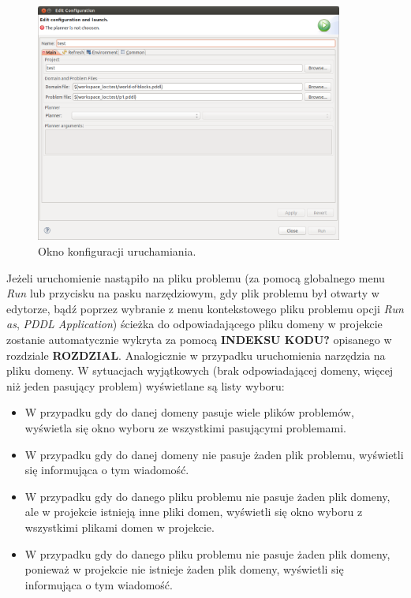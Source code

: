 \begin{figure}[h!]
    \centering
    \includegraphics[width=0.9\textwidth]{img/run_configuration_window}
    \caption{Okno konfiguracji uruchamiania.}
    \label{fig:run_configuration_window}
\end{figure}

Jeżeli uruchomienie nastąpiło na pliku problemu (za pomocą globalnego menu \textit{Run} lub przycisku na pasku narzędziowym, gdy plik problemu był otwarty w edytorze, bądź poprzez wybranie z menu kontekstowego pliku problemu opcji \textit{Run as}, \textit{PDDL Application}) ścieżka do odpowiadającego pliku domeny w projekcie zostanie automatycznie wykryta za pomocą \textbf{INDEKSU KODU?} opisanego w rozdziale \textbf{ROZDZIAL}. Analogicznie w przypadku uruchomienia narzędzia na pliku domeny. W sytuacjach wyjątkowych (brak odpowiadającej domeny, więcej niż jeden pasujący problem) wyświetlane są listy wyboru:
\begin{itemize}
\item W przypadku gdy do danej domeny pasuje wiele plików problemów, wyświetla się okno wyboru ze wszystkimi pasującymi problemami.
\item W przypadku gdy do danej domeny nie pasuje żaden plik problemu, wyświetli się informująca o tym wiadomość.
\item W przypadku gdy do danego pliku problemu nie pasuje żaden plik domeny, ale w projekcie istnieją inne pliki domen, wyświetli się okno wyboru z wszystkimi plikami domen w projekcie.
\item W przypadku gdy do danego pliku problemu nie pasuje żaden plik domeny, ponieważ w projekcie nie istnieje żaden plik domeny, wyświetli się informująca o tym wiadomość.
\end{itemize}

